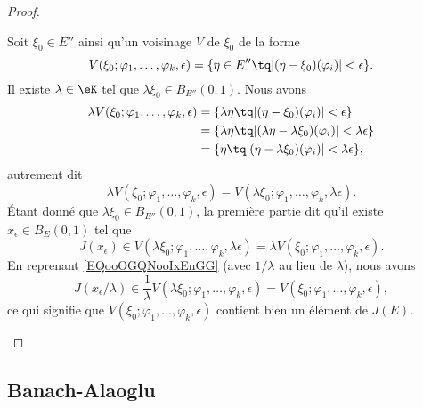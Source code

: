 \begin{proof}
\begin{subproof}
		Soit \( \xi_0\in E''\) ainsi qu'un voisinage \( V\) de \( \xi_0\) de la forme
		\begin{equation}
			V(\xi_0;\varphi_1,\ldots,\varphi_k,\epsilon)=\{ \eta\in E''\tq | (\eta-\xi_0)(\varphi_i) |<\epsilon \}.
		\end{equation}
		Il existe \( \lambda\in \eK\) tel que \( \lambda\xi_0\in B_{E''}(0,1)\). Nous avons
		\begin{subequations}
			\begin{align}
				\lambda V(\xi_0;\varphi_1,\ldots,\varphi_k,\epsilon) & = \{ \lambda\eta\tq | (\eta-\xi_0)(\varphi_i) |<\epsilon \}                     \\
				                                                     & =\{ \lambda\eta\tq | (\lambda\eta-\lambda\xi_0)(\varphi_i) |<\lambda\epsilon \} \\
				                                                     & =\{ \eta\tq | (\eta-\lambda\xi_0)(\varphi_i) |<\lambda\epsilon \},
			\end{align}
		\end{subequations}
		autrement dit
		\begin{equation}		\label{EQooOGQNooIxEnGG}
			\lambda V(\xi_0;\varphi_1,\ldots,\varphi_k,\epsilon)=V(\lambda \xi_0;\varphi_1,\ldots,\varphi_k,\lambda\epsilon).
		\end{equation}
		Étant donné que \( \lambda\xi_0\in B_{E''}(0,1)\), la première partie dit qu'il existe \( x_{\epsilon}\in B_E(0,1)\) tel que
		\begin{equation}
			J(x_{\epsilon})\in V(\lambda\xi_0;\varphi_1,\ldots,\varphi_k,\lambda\epsilon)=\lambda V(\xi_0;\varphi_1,\ldots,\varphi_k,\epsilon).
		\end{equation}
		En reprenant \eqref{EQooOGQNooIxEnGG} (avec \( 1/\lambda\) au lieu de \( \lambda\)), nous avons
		\begin{equation}
			J(x_{\epsilon}/\lambda)\in \frac{1}{ \lambda}V(\lambda\xi_0;\varphi_1,\ldots,\varphi_k,\epsilon)=V(\xi_0;\varphi_1,\ldots,\varphi_k,\epsilon),
		\end{equation}
		ce qui signifie que \( V(\xi_0;\varphi_1,\ldots,\varphi_k,\epsilon) \) contient bien un élément de \( J(E)\).
	\end{subproof}
\end{proof}

\subsection{Banach-Alaoglu}


